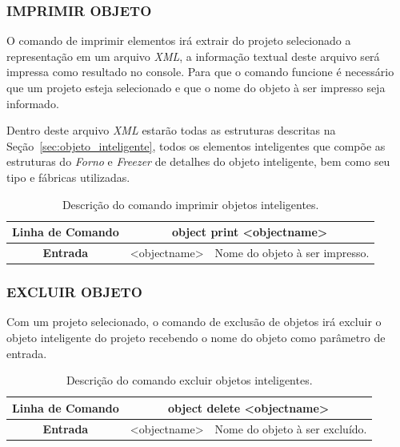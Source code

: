 \documentclass[a4paper,12pt]{monografia}
\theoremstyle{plain}
\theoremstyle{definition}
\theoremstyle{remark}
\begin{document}
\subsubsection{IMPRIMIR OBJETO}\label{sec:print_object}

O comando de imprimir elementos irá extrair do projeto selecionado a representação em um arquivo \textit{XML}, a informação textual deste arquivo será impressa como resultado no console. Para que o comando funcione é necessário que um projeto esteja selecionado e que o nome do objeto à ser impresso seja informado.

Dentro deste arquivo \textit{XML} estarão todas as estruturas descritas na Seção~\ref{sec:objeto_inteligente}, todos os elementos inteligentes que compõe as estruturas do \textit{Forno} e \textit{Freezer} de detalhes do objeto inteligente, bem como seu tipo e fábricas utilizadas.

\begin{center}
	\begin{table}[!htbp]
		\begin{tabular}{|c|c|m{}|}
			\hline
			\textbf{Linha de Comando} & \multicolumn{2}{c|}{object print <object\underline{\space\space}name>} \\
			\hline
			\textbf{Entrada} & <object\underline{\space\space}name> & Nome do objeto à ser impresso. \\
			\hline
		\end{tabular}
		\caption{Descrição do comando imprimir objetos inteligentes.}
		\label{tab:print_object}
	\end{table}
\end{center}

\subsubsection{EXCLUIR OBJETO}\label{sec:delete_object}

Com um projeto selecionado, o comando de exclusão de objetos irá excluir o objeto inteligente do projeto recebendo o nome do objeto como parâmetro de entrada.

\begin{center}
	\begin{table}[!htbp]
		\begin{tabular}{|c|c|m{}|}
			\hline
			\textbf{Linha de Comando} & \multicolumn{2}{c|}{object delete <object\underline{\space\space}name>} \\
			\hline
			\textbf{Entrada} & <object\underline{\space\space}name> & Nome do objeto à ser excluído. \\
			\hline
		\end{tabular}
		\caption{Descrição do comando excluir objetos inteligentes.}
		\label{tab:delete_object}
	\end{table}
\end{center}
\end{document}
